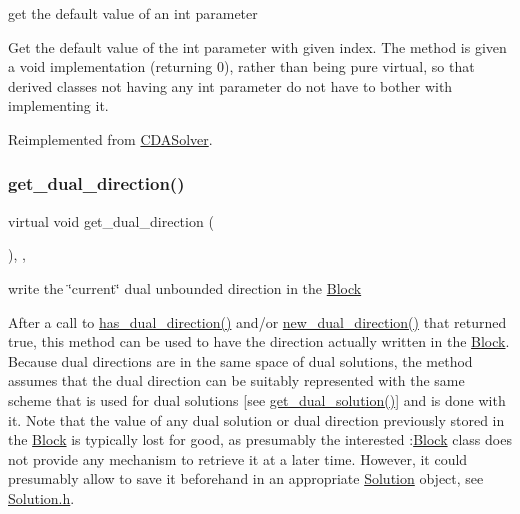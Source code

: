 get the default value of an int parameter 

Get the default value of the int parameter with given index. The method is given a void implementation (returning 0), rather than being pure virtual, so that derived classes not having any int parameter do not have to bother with implementing it. 

Reimplemented from \mbox{\hyperlink{class_s_m_spp__di__unipi__it_1_1_c_d_a_solver_a75dd1491b74c4b9476755e061dce3e04}{C\+D\+A\+Solver}}.

\mbox{\label{class_s_m_spp__di__unipi__it_1_1_m_c_f_solver_a20bea98e93ae37db17f0a0424be71987}} 
\subsubsection{\texorpdfstring{get\+\_\+dual\+\_\+direction()}{get\_dual\_direction()}}
{\footnotesize\ttfamily virtual void get\+\_\+dual\+\_\+direction (\begin{DoxyParamCaption}\item[{void}]{ }\end{DoxyParamCaption})\hspace{0.3cm}{\ttfamily [inline]}, {\ttfamily [override]}, {\ttfamily [virtual]}}



write the \char`\"{}current\char`\"{} dual unbounded direction in the \mbox{\hyperlink{class_s_m_spp__di__unipi__it_1_1_block}{Block}} 

After a call to \mbox{\hyperlink{class_s_m_spp__di__unipi__it_1_1_m_c_f_solver_a3a262f8106b76603f0828e41bbe5b022}{has\+\_\+dual\+\_\+direction()}} and/or \mbox{\hyperlink{class_s_m_spp__di__unipi__it_1_1_c_d_a_solver_ad83925e362d49bbe570a881791e45ea0}{new\+\_\+dual\+\_\+direction()}} that returned true, this method can be used to have the direction actually written in the \mbox{\hyperlink{class_s_m_spp__di__unipi__it_1_1_block}{Block}}. Because dual directions are in the same space of dual solutions, the method assumes that the dual direction can be suitably represented with the same scheme that is used for dual solutions \mbox{[}see \mbox{\hyperlink{class_s_m_spp__di__unipi__it_1_1_m_c_f_solver_a7ceb04914b5dcbb1cfd8f0e844b56014}{get\+\_\+dual\+\_\+solution()}}\mbox{]} and is done with it. Note that the value of any dual solution or dual direction previously stored in the \mbox{\hyperlink{class_s_m_spp__di__unipi__it_1_1_block}{Block}} is typically lost for good, as presumably the interested \+:\mbox{\hyperlink{class_s_m_spp__di__unipi__it_1_1_block}{Block}} class does not provide any mechanism to retrieve it at a later time. However, it could presumably allow to save it beforehand in an appropriate \mbox{\hyperlink{class_s_m_spp__di__unipi__it_1_1_solution}{Solution}} object, see \mbox{\hyperlink{_solution_8h}{Solution.\+h}}.

